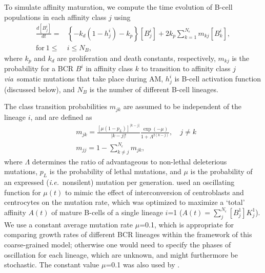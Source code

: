 \documentclass[utf8]{frontiersHLTH}%
\newcommand{\td}[2]{\frac{d {#1}}{d {#2}}}
\newcommand{\mk}[1]{} %
\newcommand{\vo}[1]{#1} %
\newcommand{\comment}[1]{} %
\newcommand{\snorm}[1]{\lvert#1\rvert}
\def\ie {{\it i.e.}}
\def\via {{\it via}}
\begin{document}
To simulate affinity maturation, we compute the time evolution of B-cell
populations in each affinity class $j$ using \mk{Should the second term in the
first brackets by ``$+k_p$''?}\comment{No, can compare with Kepler93 ref.}
\begin{equation}
\begin{aligned}
 \td{[B^i_j]}{t}=&\left\{-k_d(1-h^i_j) - k_p\right\}[B^i_j] + 2k_p\sum^{N_\epsilon}_{k=1} m_{kj} [B^i_k],\\
  \textrm{for}\ 1\le& i\le N_B,
\end{aligned}
 \label{eq:am}
\end{equation}
where $k_p$ and $k_d$ are proliferation and death constants, respectively, $m_{kj}$ is the probability
for a BCR $B^i$ in affinity class $k$ to transition to affinity class $j$ \via~somatic mutations that take place during AM,
$h^i_j$ is B-cell activation function (discussed below), and $N_B$ is the number of different B-cell lineages.

The class transition probabilities $m_{jk}$ are assumed to be independent of the lineage $i$, and are defined as
\begin{equation}
 \begin{aligned}
  &m_{jk}=\frac{\left[\mu(1-p_L)\right]^{\snorm{k-j}}}{\snorm{k-j}!} \frac{\exp(-\mu)}{1+\Lambda^{2(k-j)}}, \quad j\ne k \\
  &m_{jj}=1-\sum_{k\ne j}^{N_\epsilon} m_{jk},
 \end{aligned}
\end{equation}
where $\Lambda$ \vo{determines} the ratio of advantageous to non-lethal deleterious mutations, $p_L$ is the probability of lethal mutations,
and $\mu$ is the probability of an expressed (\ie~nonsilent) mutation per generation.\cite{kepler93}
\citet{kepler93} used an oscillating function for $\mu(t)$ to mimic the effect of interconversion of centroblasts
and centrocytes on the mutation rate, which was optimized to maximize a `total' affinity $A(t)$ 
of mature B-cells of a single lineage $i$=1 ($A(t)=\sum_j^{N_\epsilon} [B_j^1]K_j^1$).
We use a constant average mutation rate $\mu$=0.1, which is \comment{more} appropriate for comparing growth rates of different BCR 
lineages within the framework of this coarse-grained model; otherwise one would need to specify the phases of oscillation for
each lineage, which are unknown, and might furthermore be stochastic.
The constant value $\mu$=0.1 was also used by \citet{oprea97}.
\end{document}
